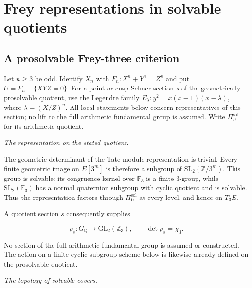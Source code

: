 \section{Frey representations in solvable quotients}
\subsection{A prosolvable Frey-three criterion}
\label{subsec:frey-three}
Let $n\ge3$ be odd. Identify $X_n$ with
$F_n:X^n+Y^n=Z^n$ and put $U=F_n-\{XYZ=0\}$.
For a point-or-cusp Selmer section $s$ of the geometrically
prosolvable quotient, use the Legendre family
$E_\lambda:y^2=x(x-1)(x-\lambda)$, where $\lambda=(X/Z)^n$.
All local statements below concern representatives of this section;
no lift to the full arithmetic fundamental group is assumed.
Write $\Pi_U^{\mathrm{sol}}$ for its arithmetic quotient.
\par\medskip\noindent\textit{The representation on the stated quotient.}\quad 

The geometric determinant of the Tate-module representation is trivial.
Every finite geometric image on \(E[3^m]\) is therefore a subgroup of
\(\mathrm{SL}_2(\mathbb Z/3^m)\). This group is solvable: its congruence
kernel over \(\mathbb F_3\) is a finite 3-group, while
\(\mathrm{SL}_2(\mathbb F_3)\) has a normal quaternion subgroup with
cyclic quotient and is solvable. Thus the representation factors through
\(\Pi_U^{\mathrm{sol}}\) at every level, and hence on \(T_3E\).

A quotient section \(s\) consequently supplies

\[
\rho_s:G_{\mathbb Q}\longrightarrow
\mathrm{GL}_2(\mathbb Z_3),\qquad \det\rho_s=\chi_3.
\]

No section of the full arithmetic fundamental group is assumed or
constructed. The action on a finite cyclic-subgroup scheme below is
likewise already defined on the prosolvable quotient.

\par\medskip\noindent\textit{The topology of solvable covers.}\quad 

